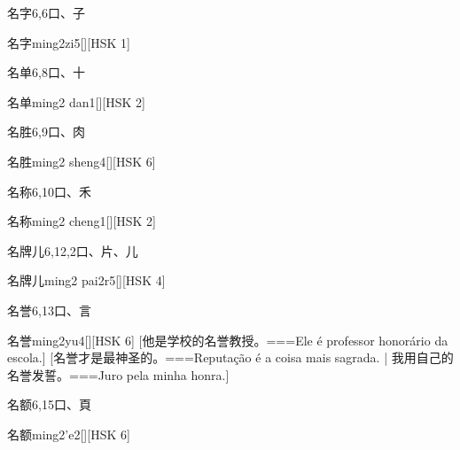 \begin{Entry}{名字}{6,6}{⼝、⼦}
  \begin{Phonetics}{名字}{ming2zi5}[][HSK 1]
  \end{Phonetics}
\end{Entry}

\begin{Entry}{名单}{6,8}{⼝、⼗}
  \begin{Phonetics}{名单}{ming2 dan1}[][HSK 2]
  \end{Phonetics}
\end{Entry}

\begin{Entry}{名胜}{6,9}{⼝、⾁}
  \begin{Phonetics}{名胜}{ming2 sheng4}[][HSK 6]
  \end{Phonetics}
\end{Entry}

\begin{Entry}{名称}{6,10}{⼝、⽲}
  \begin{Phonetics}{名称}{ming2 cheng1}[][HSK 2]
  \end{Phonetics}
\end{Entry}

\begin{Entry}{名牌儿}{6,12,2}{⼝、⽚、⼉}
  \begin{Phonetics}{名牌儿}{ming2 pai2r5}[][HSK 4]
  \end{Phonetics}
\end{Entry}

\begin{Entry}{名誉}{6,13}{⼝、⾔}
  \begin{Phonetics}{名誉}{ming2yu4}[][HSK 6]
    [他是学校的名誉教授。===Ele é professor honorário da escola.]
    [名誉才是最神圣的。===Reputação é a coisa mais sagrada. | 我用自己的名誉发誓。===Juro pela minha honra.]
  \end{Phonetics}
\end{Entry}

\begin{Entry}{名额}{6,15}{⼝、⾴}
  \begin{Phonetics}{名额}{ming2'e2}[][HSK 6]
  \end{Phonetics}
\end{Entry}

